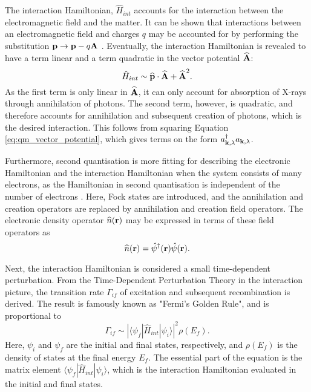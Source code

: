 The interaction Hamiltonian, $\hat{H}_{int}$ accounts for the interaction between the electromagnetic field and the matter.
It can be shown that interactions between an electromagnetic field and charges $q$ may be accounted for by performing the substitution
$\bm{\mathrm{p}} \rightarrow \bm{\mathrm{p}}-q\bm{\mathrm{A}}$ \cite{mcmorrow2011elements}. Eventually, the interaction Hamiltonian is revealed to have a term linear and a term quadratic in the vector potential $\bm{\mathrm{\widehat{A}}}$:
\begin{equation}\label{eq:qm_interaction_Hamiltonian}
    \hat{H}_{int} \sim \bm{\mathrm{\widehat{p}}} \cdot \bm{\mathrm{\widehat{A}}} + \bm{\mathrm{\widehat{A}}}^{2}.
\end{equation}
As the first term is only linear in $\bm{\mathrm{\widehat{A}}}$, it can only account for absorption of X-rays through annihilation of photons.
The second term, however, is quadratic, and therefore accounts for annihilation and subsequent creation of photons, which is the desired interaction.
This follows from squaring Equation \eqref{eq:qm_vector_potential}, which gives terms on the form $a_{\bm{\mathrm{k}},\lambda}^{\dagger} a_{\bm{\mathrm{k}},\lambda}$.

Furthermore, second quantisation is more fitting for describing the electronic Hamiltonian and the interaction Hamiltonian when the system consists of many electrons, as the Hamiltonian in second quantisation is independent of the number of electrons \cite{rohringer2020introduction}.
Here, Fock states are introduced, and the annihilation and creation operators are replaced by annihilation and creation field operators.
The electronic density operator $\widehat{n}(\bm{\mathrm{r}})$ may be expressed in terms of these field operators as
\begin{equation}\label{eq:electronic_density_operator}
    \widehat{n}(\bm{\mathrm{r}}) =  \hat{\psi}^{\dagger}(\bm{\mathrm{r}}) \hat{\psi}( \bm{\mathrm{r}}).
\end{equation}

Next, the interaction Hamiltonian is considered a small time-dependent perturbation.
From the Time-Dependent Perturbation Theory in the interaction picture, the transition rate $\Gamma_{if}$ of excitation and subsequent recombination is derived.
The result is famously known as "Fermi's Golden Rule", and is proportional to
\begin{equation}\label{eq:fermis_golden_rule}
    \Gamma_{if} \sim \left| \langle \psi_{f} | \hat{H}_{int} | \psi_{i} \rangle \right|^{2} \rho(E_{f}).
\end{equation}
Here, $\psi_{i}$ and $\psi_{f}$ are the initial and final states, respectively, and $\rho(E_{f})$ is the density of states at the final energy $E_{f}$.
The essential part of the equation is the matrix element $\langle \psi_{f} | \hat{H}_{int} | \psi_{i} \rangle$, which is the interaction Hamiltonian evaluated in the initial and final states.

